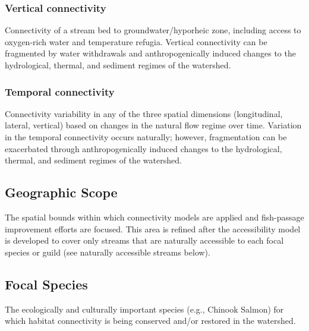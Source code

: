 \documentclass[
  letterpaper,
  DIV=11,
  numbers=noendperiod]{scrreprt}
\begin{document}
\hypertarget{vertical-connectivity}{%
\subsubsection*{Vertical connectivity}\label{vertical-connectivity}}

Connectivity of a stream bed to groundwater/hyporheic zone, including
access to oxygen-rich water and temperature refugia. Vertical
connectivity can be fragmented by water withdrawals and
anthropogenically induced changes to the hydrological, thermal, and
sediment regimes of the watershed.

\hypertarget{temporal-connectivity}{%
\subsubsection*{Temporal connectivity}\label{temporal-connectivity}}

Connectivity variability in any of the three spatial dimensions
(longitudinal, lateral, vertical) based on changes in the natural flow
regime over time. Variation in the temporal connectivity occurs
naturally; however, fragmentation can be exacerbated through
anthropogenically induced changes to the hydrological, thermal, and
sediment regimes of the watershed.

\hypertarget{geographic-scope}{%
\subsection*{Geographic Scope}\label{geographic-scope}}

The spatial bounds within which connectivity models are applied and
fish-passage improvement efforts are focused. This area is refined after
the accessibility model is developed to cover only streams that are
naturally accessible to each focal species or guild (see naturally
accessible streams below).

\hypertarget{focal-species-1}{%
\subsection*{Focal Species}\label{focal-species-1}}

The ecologically and culturally important species (e.g., Chinook Salmon)
for which habitat connectivity is being conserved and/or restored in the
watershed.
\end{document}
